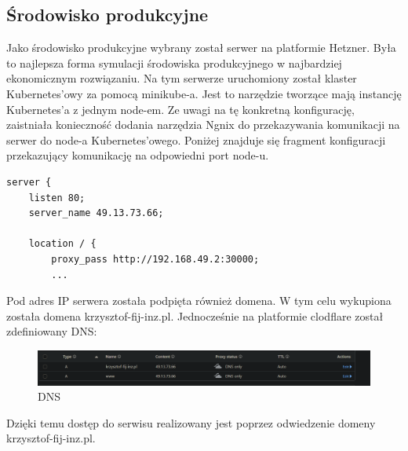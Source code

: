 \subsection{Środowisko produkcyjne}
Jako środowisko produkcyjne wybrany  został serwer na platformie Hetzner. Była to najlepsza forma symulacji środowiska produkcyjnego w najbardziej ekonomicznym rozwiązaniu. Na tym serwerze uruchomiony został klaster Kubernetes'owy za pomocą minikube-a. Jest to narzędzie tworzące mają instancję Kubernetes'a z jednym node-em. Ze uwagi  na tę konkretną konfigurację, zaistniała konieczność dodania narzędzia Ngnix do przekazywania komunikacji na serwer do node-a Kubernetes'owego. Poniżej znajduje się fragment konfiguracji przekazujący komunikację na odpowiedni port node-u.
\begin{verbatim}
server {
    listen 80;
    server_name 49.13.73.66;

    location / {
        proxy_pass http://192.168.49.2:30000;
        ...
\end{verbatim}

Pod adres IP serwera została podpięta również domena. W tym celu wykupiona została domena krzysztof-fij-inz.pl. Jednocześnie na platformie clodflare został zdefiniowany DNS: 
\begin{figure}[H]
    \centering
    \includegraphics[width=1\linewidth]{img/dns_cloudflare.png}
    \caption{DNS}
    \label{fig:DNS-label}
\end{figure}
Dzięki temu dostęp do serwisu realizowany jest poprzez odwiedzenie domeny krzysztof-fij-inz.pl.
